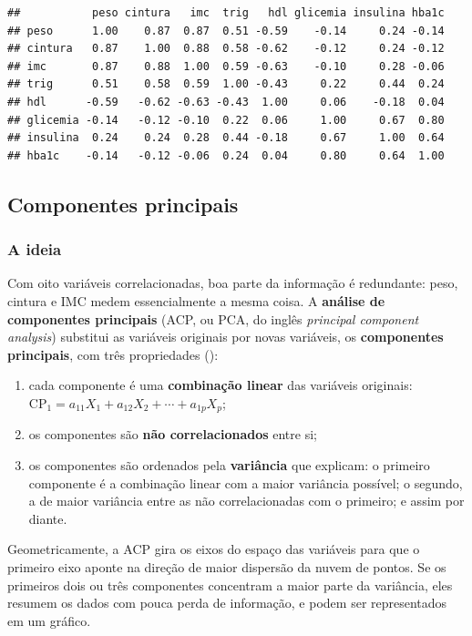 \documentclass[
]{book}
\providecommand{\tightlist}{%
  \setlength{\itemsep}{0pt}\setlength{\parskip}{0pt}}
\begin{document}
\begin{verbatim}
##           peso cintura   imc  trig   hdl glicemia insulina hba1c
## peso      1.00    0.87  0.87  0.51 -0.59    -0.14     0.24 -0.14
## cintura   0.87    1.00  0.88  0.58 -0.62    -0.12     0.24 -0.12
## imc       0.87    0.88  1.00  0.59 -0.63    -0.10     0.28 -0.06
## trig      0.51    0.58  0.59  1.00 -0.43     0.22     0.44  0.24
## hdl      -0.59   -0.62 -0.63 -0.43  1.00     0.06    -0.18  0.04
## glicemia -0.14   -0.12 -0.10  0.22  0.06     1.00     0.67  0.80
## insulina  0.24    0.24  0.28  0.44 -0.18     0.67     1.00  0.64
## hba1c    -0.14   -0.12 -0.06  0.24  0.04     0.80     0.64  1.00
\end{verbatim}

\subsection{Componentes principais}\label{componentes-principais}

\subsubsection{A ideia}\label{a-ideia}

Com oito variáveis correlacionadas, boa parte da informação é redundante: peso, cintura e IMC medem essencialmente a mesma coisa. A \textbf{análise de componentes principais} (ACP, ou PCA, do inglês \emph{principal component analysis}) substitui as variáveis originais por novas variáveis, os \textbf{componentes principais}, com três propriedades ():

\begin{enumerate}
\def\labelenumi{\arabic{enumi}.}
\tightlist
\item
  cada componente é uma \textbf{combinação linear} das variáveis originais: \(\text{CP}_1 = a_{11}X_1 + a_{12}X_2 + \cdots + a_{1p}X_p\);
\item
  os componentes são \textbf{não correlacionados} entre si;
\item
  os componentes são ordenados pela \textbf{variância} que explicam: o primeiro componente é a combinação linear com a maior variância possível; o segundo, a de maior variância entre as não correlacionadas com o primeiro; e assim por diante.
\end{enumerate}

Geometricamente, a ACP gira os eixos do espaço das variáveis para que o primeiro eixo aponte na direção de maior dispersão da nuvem de pontos. Se os primeiros dois ou três componentes concentram a maior parte da variância, eles resumem os dados com pouca perda de informação, e podem ser representados em um gráfico.
\end{document}
